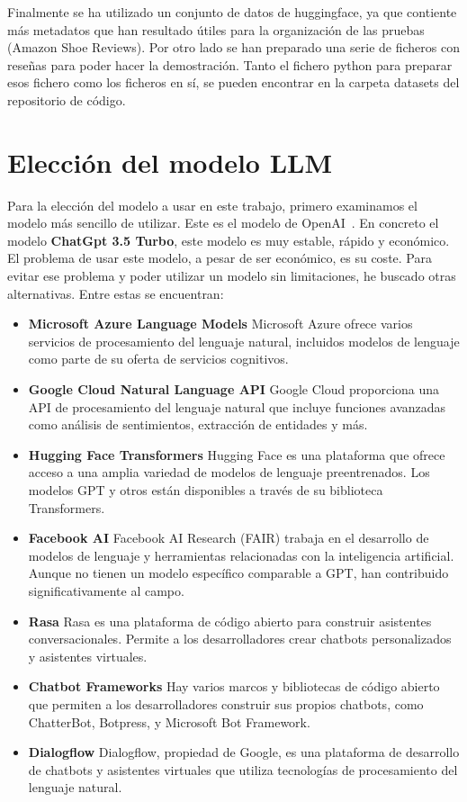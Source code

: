 Finalmente se ha utilizado un conjunto de datos de huggingface, ya que contiente más metadatos que han resultado útiles
para la organización de las pruebas (Amazon Shoe Reviews).
Por otro lado se han preparado una serie de ficheros con reseñas para poder hacer la demostración.
Tanto el fichero python para preparar esos fichero como los ficheros en sí, se pueden encontrar en la 
carpeta datasets del repositorio de código.

\section{Elección del modelo LLM}

Para la elección del modelo a usar en este trabajo, primero examinamos el modelo más sencillo de utilizar.
Este es el modelo de OpenAI~\cite{chatgpt1}. En concreto el modelo \textbf{ChatGpt 3.5 Turbo}, este modelo es muy estable, rápido y económico.
El problema de usar este modelo, a pesar de ser económico, es su coste.
Para evitar ese problema y poder utilizar un modelo sin limitaciones, he buscado otras alternativas.
Entre estas se encuentran:
\begin{itemize}
   \item \textbf{Microsoft Azure Language Models} Microsoft Azure ofrece varios servicios de procesamiento del lenguaje natural, incluidos modelos de lenguaje como parte de su oferta de servicios cognitivos.
   \item \textbf{Google Cloud Natural Language API} Google Cloud proporciona una API de procesamiento del lenguaje natural que incluye funciones avanzadas como análisis de sentimientos, extracción de entidades y más.
   \item \textbf{Hugging Face Transformers} Hugging Face es una plataforma que ofrece acceso a una amplia variedad de modelos de lenguaje preentrenados. Los modelos GPT y otros están disponibles a través de su biblioteca Transformers.
   \item \textbf{Facebook AI} Facebook AI Research (FAIR) trabaja en el desarrollo de modelos de lenguaje y herramientas relacionadas con la inteligencia artificial. Aunque no tienen un modelo específico comparable a GPT, han contribuido significativamente al campo.
   \item \textbf{Rasa} Rasa es una plataforma de código abierto para construir asistentes conversacionales. Permite a los desarrolladores crear chatbots personalizados y asistentes virtuales.
   \item \textbf{Chatbot Frameworks} Hay varios marcos y bibliotecas de código abierto que permiten a los desarrolladores construir sus propios chatbots, como ChatterBot, Botpress, y Microsoft Bot Framework.
   \item \textbf{Dialogflow} Dialogflow, propiedad de Google, es una plataforma de desarrollo de chatbots y asistentes virtuales que utiliza tecnologías de procesamiento del lenguaje natural.
\end{itemize}

